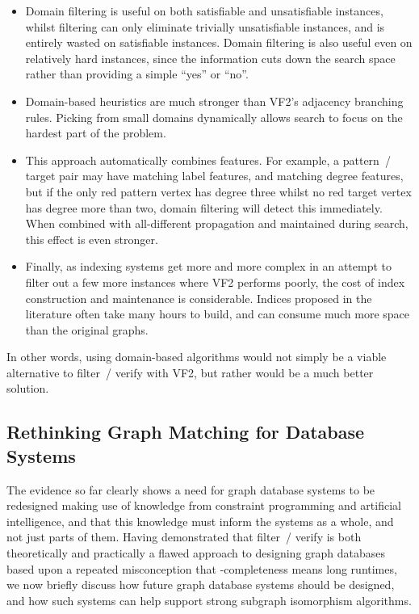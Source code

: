 \documentclass[twoside,11pt]{article}
\begin{document}
\begin{itemize}
    \item Domain filtering is useful on both satisfiable and unsatisfiable instances, whilst
        filtering can only eliminate trivially unsatisfiable instances, and is entirely wasted on
        satisfiable instances. Domain filtering is also useful even on relatively hard instances,
        since the information cuts down the search space rather than providing a simple ``yes'' or
        ``no''.

    \item Domain-based heuristics are much stronger than VF2's adjacency branching rules. Picking
        from small domains dynamically allows search to focus on the hardest part of the problem.

    \item This approach automatically combines features. For example, a pattern~/ target pair may
        have matching label features, and matching degree features, but if the only red pattern
        vertex has degree three whilst no red target vertex has degree more than two, domain
        filtering will detect this immediately. When combined with all-different propagation and
        maintained during search, this effect is even stronger.

    \item Finally, as indexing systems get more and more complex in an attempt to filter out a few more
        instances where VF2 performs poorly, the cost of index construction and maintenance is
        considerable.  Indices proposed in the literature often take many hours to build, and can
        consume much more space than the original graphs.
\end{itemize}

In other words, using domain-based algorithms would not simply be a viable alternative to filter~/
verify with VF2, but rather would be a much better solution.

\subsection{Rethinking Graph Matching for Database Systems}

The evidence so far clearly shows a need for graph database systems to be redesigned making use of
knowledge from constraint programming and artificial intelligence, and that this knowledge must inform
the systems as a whole, and not just parts of them.  Having demonstrated that filter~/ verify is
both theoretically and practically a flawed approach to designing graph databases based upon a
repeated misconception that \NP-completeness means long runtimes, we now briefly discuss how future
graph database systems should be designed, and how such systems can help support strong subgraph
isomorphism algorithms.
\end{document}
